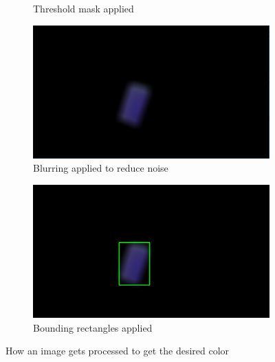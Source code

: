 \documentclass[titlepage, 12pt]{scrartcl}
\begin{document}
\begin{figure}[h!]
\begin{subfigure}[b]{0.4\linewidth}
            \caption{Threshold mask applied}
        \end{subfigure}
        \begin{subfigure}[b]{0.4\linewidth}
            \includegraphics[width=\linewidth]{figures/Capture2.PNG}
            \caption{Blurring applied to reduce noise}
        \end{subfigure}
        \begin{subfigure}[b]{0.4\linewidth}
            \includegraphics[width=\linewidth]{figures/Capture1.PNG}
            \caption{Bounding rectangles applied}
        \end{subfigure}
        \caption{How an image gets processed to get the desired color}
        \label{fig:Images}
    \end{figure}
\end{document}
